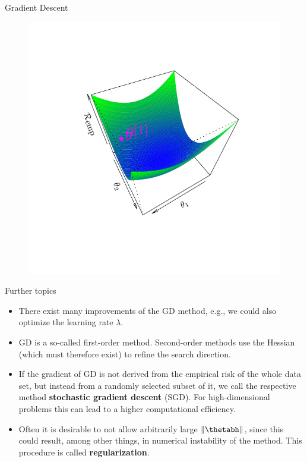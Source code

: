 \documentclass[11pt,compress,t,notes=noshow, xcolor=table]{beamer}
\begin{document}
\begin{vbframe}{Gradient Descent}
\begin{figure}[!htb]
\endminipage\hfill
{}%
  \includegraphics[trim=2cm 2cm 2cm 2cm, width=\linewidth]{figure/grad_desc3}
\endminipage
\end{figure}

\end{vbframe}
\begin{vbframe}{Further topics}
\begin{itemize}
\item There exist many improvements of the GD method, e.g., we could also optimize the learning rate $\lambda$.
\item GD is a so-called first-order method. Second-order methods use the Hessian (which must therefore exist) to refine the search direction.
\item If the gradient of GD is not derived from the empirical risk of the whole data set, but instead from a randomly selected subset of it, we call the respective method \textbf{stochastic gradient descent} (SGD). For high-dimensional problems this can lead to a higher computational efficiency.
\item Often it is desirable to not allow arbitrarily large $\Vert \thetabh \Vert$, since this could result, among other things, in numerical instability of the method. This procedure is called \textbf{regularization}.
\end{itemize}
\end{vbframe}

\endlecture
\end{document}
